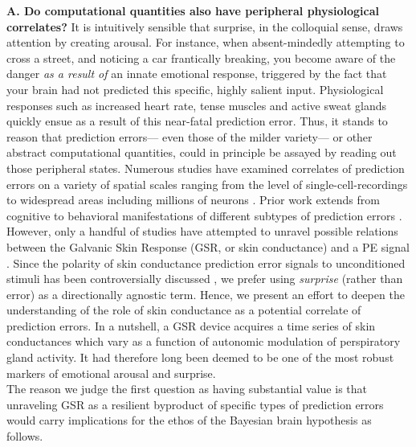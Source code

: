 \documentclass{article}
\begin{document}
\begin{multicols}{2}
\textbf{A. Do computational quantities also have peripheral physiological correlates?}
It is intuitively sensible that surprise, in the colloquial sense, draws attention by creating arousal. For instance, when absent-mindedly attempting to cross a street, and noticing a car frantically breaking, you become aware of the danger \textit{as a result of} an innate emotional response, triggered by the fact that your brain had not predicted this specific, highly salient input. Physiological responses such as increased heart rate, tense muscles and active sweat glands quickly ensue as a result of this near-fatal prediction error. Thus, it stands to reason that prediction errors--- even those of the milder variety--- or other abstract computational quantities, could in principle be assayed by reading out those peripheral states. Numerous studies have examined correlates of prediction errors on a variety of spatial scales ranging from the level of single-cell-recordings \citep{o2013risk} to widespread areas including millions of neurons \citep{brydevall2018neural}. Prior work extends from cognitive to behavioral manifestations of different subtypes of prediction errors \citep{iglesias2017models,den2012prediction}. However, only a handful of studies have attempted to unravel possible relations between the Galvanic Skin Response (GSR, or skin conductance) and a PE signal \citep{bach2010dynamic,spoormaker2011neural}. Since the polarity of skin conductance prediction error signals to unconditioned stimuli has been controversially discussed \citep{spoormaker2012additional}, we prefer using \textit{surprise} (rather than error) as a directionally agnostic term. Hence, we present an effort to deepen the understanding of the role of skin conductance as a potential correlate of prediction errors. In a nutshell, a GSR device acquires a time series of skin conductances which vary as a function of autonomic modulation of perspiratory gland activity. It had therefore long been deemed to be one of the most robust markers of emotional arousal and surprise.\\%
The reason we judge the first question as having substantial value is that unraveling GSR as a resilient byproduct of specific types of prediction errors would carry implications for the ethos of the Bayesian brain hypothesis as follows. 

\end{multicols}
\end{document}
